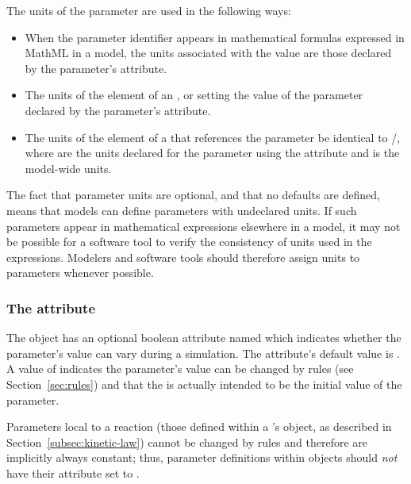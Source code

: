 The units of the parameter are used in the following ways:
\begin{itemize}

\item When the parameter identifier appears in mathematical
  formulas expressed in MathML in a model, the units associated
  with the value are those declared by the parameter's
   attribute.

\item The units of the  element of an \AssignmentRule,
  \InitialAssignment or \EventAssignment setting the value of the
  parameter  declared by the
  parameter's  attribute.

\item The units of the  element of a \RateRule that
  references the parameter  be identical to /, where  are
  the units declared for the parameter using the 
  attribute and  is the model-wide 
  units.

\end{itemize}
\vspace*{-1ex}

The fact that parameter units are optional, and that no defaults
are defined, means that models can define parameters with
undeclared units.  If such parameters appear in mathematical
expressions elsewhere in a model, it may not be possible for a
software tool to verify the consistency of units used in the
expressions.  Modelers and software tools should therefore assign
units to parameters whenever possible.


\subsubsection{The  attribute}
\label{sec:parameter-constant}

The \Parameter object has an optional boolean attribute named
 which indicates whether the parameter's value can
vary during a simulation.  The attribute's default value is
.  A value of  indicates the parameter's
value can be changed by rules (see Section~\ref{sec:rules}) and
that the  is actually intended to be the initial
value of the parameter.

Parameters local to a reaction (\ie those defined within a
\Reaction's \KineticLaw object, as described in
Section~\ref{subsec:kinetic-law}) cannot be changed by rules and
therefore are implicitly always constant; thus, parameter
definitions within \Reaction objects should \emph{not} have
their  attribute set to .

